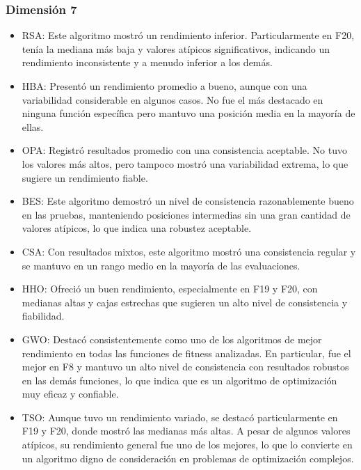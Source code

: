 \documentclass[conference]{IEEEtran}
\begin{document}
\subsubsection{Dimensión 7}
\begin{itemize}
	\item RSA: Este algoritmo mostró un rendimiento inferior. Particularmente en F20, tenía la mediana más baja y valores atípicos significativos, indicando un rendimiento inconsistente y a menudo inferior a los demás.
	
	\item HBA: Presentó un rendimiento promedio a bueno, aunque con una variabilidad considerable en algunos casos. No fue el más destacado en ninguna función específica pero mantuvo una posición media en la mayoría de ellas.
	
	\item OPA: Registró resultados promedio con una consistencia aceptable. No tuvo los valores más altos, pero tampoco mostró una variabilidad extrema, lo que sugiere un rendimiento fiable.
	
	\item BES: Este algoritmo demostró un nivel de consistencia razonablemente bueno en las pruebas, manteniendo posiciones intermedias sin una gran cantidad de valores atípicos, lo que indica una robustez aceptable.
	
	\item CSA: Con resultados mixtos, este algoritmo mostró una consistencia regular y se mantuvo en un rango medio en la mayoría de las evaluaciones.
	
	\item HHO: Ofreció un buen rendimiento, especialmente en F19 y F20, con medianas altas y cajas estrechas que sugieren un alto nivel de consistencia y fiabilidad.
	
	\item GWO: Destacó consistentemente como uno de los algoritmos de mejor rendimiento en todas las funciones de fitness analizadas. En particular, fue el mejor en F8 y mantuvo un alto nivel de consistencia con resultados robustos en las demás funciones, lo que indica que es un algoritmo de optimización muy eficaz y confiable.
	
	\item TSO: Aunque tuvo un rendimiento variado, se destacó particularmente en F19 y F20, donde mostró las medianas más altas. A pesar de algunos valores atípicos, su rendimiento general fue uno de los mejores, lo que lo convierte en un algoritmo digno de consideración en problemas de optimización complejos.
	
\end{itemize}
\end{document}
